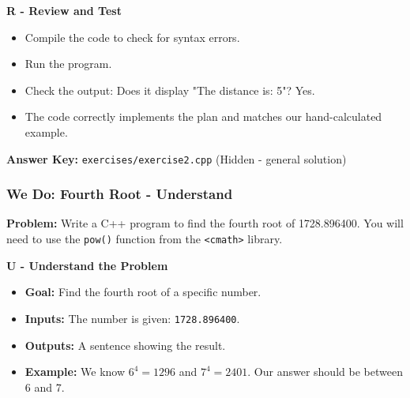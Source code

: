 \documentclass{beamer}
\begin{document}
\begin{frame}
    
\textbf{R - Review and Test}
\begin{itemize}
    \item Compile the code to check for syntax errors.
    \item Run the program.
    \item Check the output: Does it display "The distance is: 5"? Yes.
    \item The code correctly implements the plan and matches our hand-calculated example.
\end{itemize}
\textbf{Answer Key:} \texttt{exercises/exercise2.cpp} (Hidden - general solution)
\end{frame}

\begin{frame}
\frametitle{We Do: Fourth Root - Understand}
\textbf{Problem:} Write a C++ program to find the fourth root of \alert{1728.896400}. You will need to use the \texttt{pow()} function from the \texttt{<cmath>} library.

\vfill
\textbf{U - Understand the Problem}
\begin{itemize}
    \item \textbf{Goal:} Find the fourth root of a specific number.
    \item \textbf{Inputs:} The number is given: \texttt{1728.896400}.
    \item \textbf{Outputs:} A sentence showing the result.
    \item \textbf{Example:} We know $6^4 = 1296$ and $7^4 = 2401$. Our answer should be between 6 and 7.
\end{itemize}
\end{frame}
\end{document}

